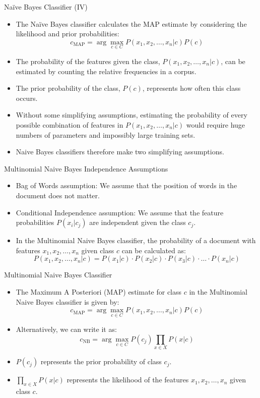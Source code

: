 \documentclass[handout]{beamer}
\begin{document}
\begin{frame}{Naïve Bayes Classifier (IV)}
\scriptsize
\begin{itemize}
    \item The Naïve Bayes classifier \cite{mccallum1998comparison} calculates the MAP estimate by considering the likelihood and prior probabilities:
    \[
    c_{\text{MAP}} = \arg\max_{c \in C} P(x_1, x_2, \ldots, x_n | c)P(c)
    \]
    \item The probability of the features given the class, $P(x_1, x_2, \ldots, x_n | c)$, can be estimated by counting the relative frequencies in a corpus.
    \item The prior probability of the class, $P(c)$, represents how often this class occurs.
    \item Without some simplifying assumptions, estimating the probability of every possible combination of
features in $P(x_1, x_2, \ldots, x_n | c)$ would require huge numbers of parameters and impossibly large training sets. 
\item Naive Bayes classifiers therefore make two simplifying assumptions.
\end{itemize}
\end{frame}

\begin{frame}{Multinomial Naive Bayes Independence Assumptions}
\scriptsize
\begin{itemize}
    \item Bag of Words assumption: We assume that the position of words in the document does not matter.
    \item Conditional Independence assumption: We assume that the feature probabilities $P(x_i | c_j)$ are independent given the class $c_j$.
    \item In the Multinomial Naive Bayes classifier, the probability of a document with features $x_1, x_2, \ldots, x_n$ given class $c$ can be calculated as:
    \[
    P(x_1, x_2, \ldots, x_n | c) = P(x_1 | c) \cdot P(x_2 | c) \cdot P(x_3 | c) \cdot \ldots \cdot P(x_n | c)
    \]
\end{itemize}
\end{frame}

\begin{frame}{Multinomial Naive Bayes Classifier}
\scriptsize
\begin{itemize}
    \item The Maximum A Posteriori (MAP) estimate for class $c$ in the Multinomial Naive Bayes classifier is given by:
    \[
    c_{\text{MAP}} = \arg\max_{c \in C} P(x_1, x_2, \ldots, x_n | c)P(c)
    \]
    \item Alternatively, we can write it as:
    \[
    c_{\text{NB}} = \arg\max_{c \in C} P(c_j) \prod_{x \in X} P(x | c)
    \]
    \item $P(c_j)$ represents the prior probability of class $c_j$.
    \item $\prod_{x \in X} P(x | c)$ represents the likelihood of the features $x_1, x_2, \ldots, x_n$ given class $c$.
\end{itemize}
\end{frame}
\end{document}
